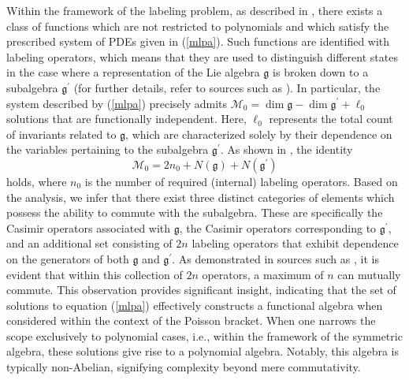 \documentclass[10pt]{amsart}
\theoremstyle{definition}
\theoremstyle{corollary}
\theoremstyle{remark}
\theoremstyle{conclusion}
\begin{document}
Within the framework of the labeling problem, as described in \cite{MR2749089}, there exists a class of functions which are not restricted to polynomials and which satisfy the prescribed system of PDEs given in (\ref{mlpa}). Such functions are identified with labeling operators, which means that they are used to distinguish different states in the case where a representation of the Lie algebra $\mathfrak{g}$ is broken down to a subalgebra $\mathfrak{g}^{\prime}$ (for further details, refer to sources such as \cite{MR170975}). In particular, the system described by (\ref{mlpa}) precisely admits $\mathcal{M}_0=\dim \mathfrak{g}-\dim\mathfrak{g}^{\prime}+\ell_0$ solutions that are functionally independent. Here, $\ell_0$ represents the total count of invariants related to $\mathfrak{g}$, which are characterized solely by their dependence on the variables pertaining to the subalgebra $\mathfrak{g}^{\prime}$. As shown in \cite{MR0411412}, the identity 
\begin{equation}
	\mathcal{M}_0=2n_0+N\left(\mathfrak{g}\right)+N\left(\mathfrak{g}^{\prime}\right)
\end{equation}
holds, where $n_0$ is the number of required (internal) labeling operators. Based on the analysis, we infer that there exist three distinct categories of elements which possess the ability to commute with the subalgebra. These are specifically the Casimir operators associated with $\mathfrak{g}$, the Casimir operators corresponding to $\mathfrak{g}^{\prime}$, and an additional set consisting of $2n$ labeling operators that exhibit dependence on the generators of both $\mathfrak{g}$ and $\mathfrak{g}^{\prime}$. As demonstrated in sources such as \cite{MR0411412}, it is evident that within this collection of $2n$ operators, a maximum of $n$ can mutually commute. This observation provides significant insight, indicating that the set of solutions to equation (\ref{mlpa}) effectively constructs a functional algebra when considered within the context of the Poisson bracket. When one narrows the scope exclusively to polynomial cases, i.e., within the framework of the symmetric algebra, these solutions give rise to a polynomial algebra. Notably, this algebra is typically non-Abelian, signifying complexity beyond mere commutativity. %
\end{document}
